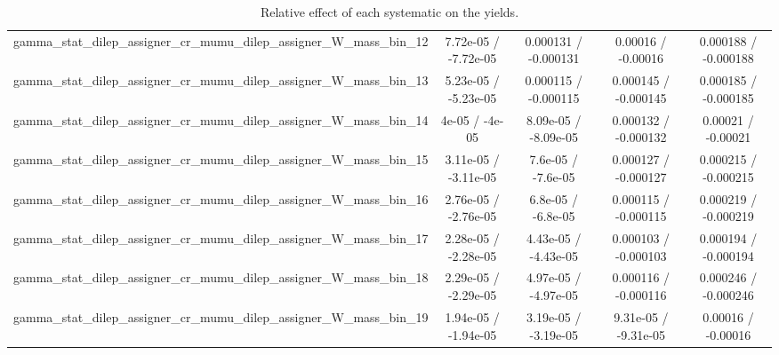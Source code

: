 \documentclass[10pt]{article}
\begin{document}
\begin{table}[htbp]
\begin{center}
\begin{tabular}{|c|c|c|c|c|}
  gamma_stat_dilep_assigner_cr_mumu_dilep_assigner_W_mass_bin_12 & 7.72e-05 / -7.72e-05 & 0.000131 / -0.000131 & 0.00016 / -0.00016 & 0.000188 / -0.000188 \\ 
  gamma_stat_dilep_assigner_cr_mumu_dilep_assigner_W_mass_bin_13 & 5.23e-05 / -5.23e-05 & 0.000115 / -0.000115 & 0.000145 / -0.000145 & 0.000185 / -0.000185 \\ 
  gamma_stat_dilep_assigner_cr_mumu_dilep_assigner_W_mass_bin_14 & 4e-05 / -4e-05 & 8.09e-05 / -8.09e-05 & 0.000132 / -0.000132 & 0.00021 / -0.00021 \\ 
  gamma_stat_dilep_assigner_cr_mumu_dilep_assigner_W_mass_bin_15 & 3.11e-05 / -3.11e-05 & 7.6e-05 / -7.6e-05 & 0.000127 / -0.000127 & 0.000215 / -0.000215 \\ 
  gamma_stat_dilep_assigner_cr_mumu_dilep_assigner_W_mass_bin_16 & 2.76e-05 / -2.76e-05 & 6.8e-05 / -6.8e-05 & 0.000115 / -0.000115 & 0.000219 / -0.000219 \\ 
  gamma_stat_dilep_assigner_cr_mumu_dilep_assigner_W_mass_bin_17 & 2.28e-05 / -2.28e-05 & 4.43e-05 / -4.43e-05 & 0.000103 / -0.000103 & 0.000194 / -0.000194 \\ 
  gamma_stat_dilep_assigner_cr_mumu_dilep_assigner_W_mass_bin_18 & 2.29e-05 / -2.29e-05 & 4.97e-05 / -4.97e-05 & 0.000116 / -0.000116 & 0.000246 / -0.000246 \\ 
  gamma_stat_dilep_assigner_cr_mumu_dilep_assigner_W_mass_bin_19 & 1.94e-05 / -1.94e-05 & 3.19e-05 / -3.19e-05 & 9.31e-05 / -9.31e-05 & 0.00016 / -0.00016 \\ 
\hline 
\end{tabular} 
\caption{Relative effect of each systematic on the yields.} 
\end{center} 
\end{table} 
\end{document}
